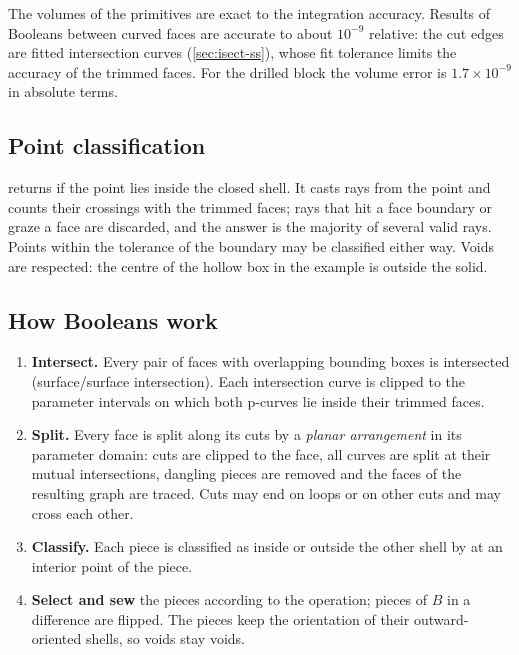 The volumes of the primitives are exact to the integration accuracy. Results of Booleans
between curved faces are accurate to about $10^{-9}$ relative: the cut edges are fitted
intersection curves (\cref{sec:isect-ss}), whose fit tolerance limits the accuracy of the
trimmed faces. For the drilled block the volume error is $1.7\times10^{-9}$ in absolute terms.

\subsection{Point classification}

 returns  if the
point lies inside the closed shell. It casts rays from the point and counts their crossings
with the trimmed faces; rays that hit a face boundary or graze a face are discarded, and the
answer is the majority of several valid rays. Points within the tolerance of the boundary may
be classified either way. Voids are respected: the centre of the hollow box in the example is
outside the solid.

\subsection{How Booleans work}\label{sec:boolean-algorithm}

\begin{enumerate}
\item \textbf{Intersect.} Every pair of faces with overlapping bounding boxes is intersected
(surface/surface intersection). Each intersection curve is clipped to the parameter intervals
on which both p-curves lie inside their trimmed faces.
\item \textbf{Split.} Every face is split along its cuts by a \emph{planar arrangement} in its
parameter domain: cuts are clipped to the face, all curves are split at their mutual
intersections, dangling pieces are removed and the faces of the resulting graph are traced.
Cuts may end on loops or on other cuts and may cross each other.
\item \textbf{Classify.} Each piece is classified as inside or outside the other shell by
 at an interior point of the piece.
\item \textbf{Select and sew} the pieces according to the operation; pieces of $B$ in a
difference are flipped. The pieces keep the orientation of their outward-oriented shells, so
voids stay voids.
\end{enumerate}

